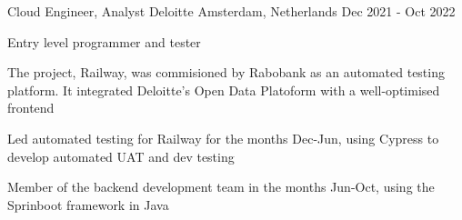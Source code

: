 

\begin{cventries}

  \cventry
    {Cloud Engineer, Analyst} %
    {Deloitte} %
    {Amsterdam, Netherlands} %
    {Dec 2021 - Oct 2022} %
    {
      \begin{cvitems} %
        \item {Entry level programmer and tester}
        \item {The project, Railway, was commisioned by Rabobank as an automated testing platform. It integrated Deloitte's Open Data Platoform  with a well-optimised frontend}
		\item {Led automated testing for Railway for the months Dec-Jun, using Cypress to develop automated UAT and dev testing}
		\item {Member of the backend development team in the months Jun-Oct, using the Sprinboot framework in Java}
      \end{cvitems}
    }


\end{cventries}
